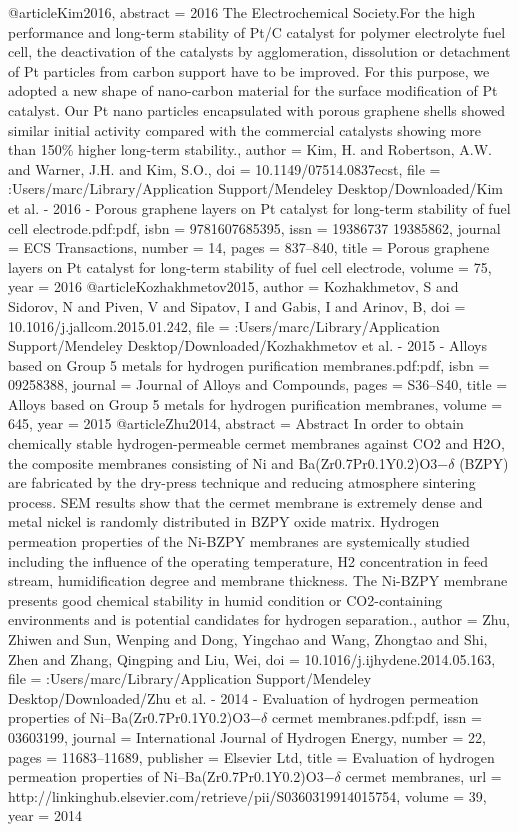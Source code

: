 @article{Kim2016,
abstract = {{\textcopyright} 2016 The Electrochemical Society.For the high performance and long-term stability of Pt/C catalyst for polymer electrolyte fuel cell, the deactivation of the catalysts by agglomeration, dissolution or detachment of Pt particles from carbon support have to be improved. For this purpose, we adopted a new shape of nano-carbon material for the surface modification of Pt catalyst. Our Pt nano particles encapsulated with porous graphene shells showed similar initial activity compared with the commercial catalysts showing more than 150{\%} higher long-term stability.},
author = {Kim, H. and Robertson, A.W. and Warner, J.H. and Kim, S.O.},
doi = {10.1149/07514.0837ecst},
file = {:Users/marc/Library/Application Support/Mendeley Desktop/Downloaded/Kim et al. - 2016 - Porous graphene layers on Pt catalyst for long-term stability of fuel cell electrode.pdf:pdf},
isbn = {9781607685395},
issn = {19386737 19385862},
journal = {ECS Transactions},
number = {14},
pages = {837--840},
title = {{Porous graphene layers on Pt catalyst for long-term stability of fuel cell electrode}},
volume = {75},
year = {2016}
}
@article{Kozhakhmetov2015,
author = {Kozhakhmetov, S and Sidorov, N and Piven, V and Sipatov, I and Gabis, I and Arinov, B},
doi = {10.1016/j.jallcom.2015.01.242},
file = {:Users/marc/Library/Application Support/Mendeley Desktop/Downloaded/Kozhakhmetov et al. - 2015 - Alloys based on Group 5 metals for hydrogen purification membranes.pdf:pdf},
isbn = {09258388},
journal = {Journal of Alloys and Compounds},
pages = {S36--S40},
title = {{Alloys based on Group 5 metals for hydrogen purification membranes}},
volume = {645},
year = {2015}
}
@article{Zhu2014,
abstract = {Abstract In order to obtain chemically stable hydrogen-permeable cermet membranes against CO2 and H2O, the composite membranes consisting of Ni and Ba(Zr0.7Pr0.1Y0.2)O3−$\delta$ (BZPY) are fabricated by the dry-press technique and reducing atmosphere sintering process. SEM results show that the cermet membrane is extremely dense and metal nickel is randomly distributed in BZPY oxide matrix. Hydrogen permeation properties of the Ni-BZPY membranes are systemically studied including the influence of the operating temperature, H2 concentration in feed stream, humidification degree and membrane thickness. The Ni-BZPY membrane presents good chemical stability in humid condition or CO2-containing environments and is potential candidates for hydrogen separation.},
author = {Zhu, Zhiwen and Sun, Wenping and Dong, Yingchao and Wang, Zhongtao and Shi, Zhen and Zhang, Qingping and Liu, Wei},
doi = {10.1016/j.ijhydene.2014.05.163},
file = {:Users/marc/Library/Application Support/Mendeley Desktop/Downloaded/Zhu et al. - 2014 - Evaluation of hydrogen permeation properties of Ni–Ba(Zr0.7Pr0.1Y0.2)O3−$\delta$ cermet membranes.pdf:pdf},
issn = {03603199},
journal = {International Journal of Hydrogen Energy},
number = {22},
pages = {11683--11689},
publisher = {Elsevier Ltd},
title = {{Evaluation of hydrogen permeation properties of Ni–Ba(Zr0.7Pr0.1Y0.2)O3−$\delta$ cermet membranes}},
url = {http://linkinghub.elsevier.com/retrieve/pii/S0360319914015754},
volume = {39},
year = {2014}
}
